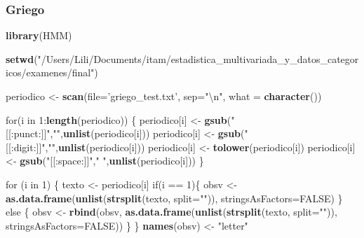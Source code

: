 \documentclass[]{article}
\newenvironment{Shaded}{\begin{snugshade}}{\end{snugshade}}
\newcommand{\KeywordTok}[1]{\textcolor[rgb]{0.13,0.29,0.53}{\textbf{{#1}}}}
\newcommand{\DataTypeTok}[1]{\textcolor[rgb]{0.13,0.29,0.53}{{#1}}}
\newcommand{\DecValTok}[1]{\textcolor[rgb]{0.00,0.00,0.81}{{#1}}}
\newcommand{\CharTok}[1]{\textcolor[rgb]{0.31,0.60,0.02}{{#1}}}
\newcommand{\StringTok}[1]{\textcolor[rgb]{0.31,0.60,0.02}{{#1}}}
\newcommand{\OtherTok}[1]{\textcolor[rgb]{0.56,0.35,0.01}{{#1}}}
\newcommand{\NormalTok}[1]{{#1}}
\begin{document}
\subsubsection{Griego}\label{griego}

\begin{Shaded}
\begin{Highlighting}[]
\KeywordTok{library}\NormalTok{(HMM)}

\KeywordTok{setwd}\NormalTok{(}\StringTok{"/Users/Lili/Documents/itam/estadistica_multivariada_y_datos_categoricos/examenes/final"}\NormalTok{)}


\NormalTok{periodico <-}\StringTok{ }\KeywordTok{scan}\NormalTok{(}\DataTypeTok{file=}\StringTok{'griego_test.txt'}\NormalTok{, }\DataTypeTok{sep=}\StringTok{"}\CharTok{\textbackslash{}n}\StringTok{"}\NormalTok{, }\DataTypeTok{what =} \KeywordTok{character}\NormalTok{())}



\NormalTok{for(i in }\DecValTok{1}\NormalTok{:}\KeywordTok{length}\NormalTok{(periodico)) \{}
  \NormalTok{periodico[i] <-}\StringTok{ }\KeywordTok{gsub}\NormalTok{(}\StringTok{"[[:punct:]]"}\NormalTok{,}\StringTok{""}\NormalTok{,}\KeywordTok{unlist}\NormalTok{(periodico[i]))}
  \NormalTok{periodico[i] <-}\StringTok{ }\KeywordTok{gsub}\NormalTok{(}\StringTok{"[[:digit:]]"}\NormalTok{,}\StringTok{""}\NormalTok{,}\KeywordTok{unlist}\NormalTok{(periodico[i]))}
  \NormalTok{periodico[i] <-}\StringTok{ }\KeywordTok{tolower}\NormalTok{(periodico[i])}
  \NormalTok{periodico[i] <-}\StringTok{ }\KeywordTok{gsub}\NormalTok{(}\StringTok{"[[:space:]]"}\NormalTok{,}\StringTok{" "}\NormalTok{,}\KeywordTok{unlist}\NormalTok{(periodico[i]))}
\NormalTok{\}}



\NormalTok{for (i in }\DecValTok{1}\NormalTok{) \{}
  \NormalTok{texto <-}\StringTok{ }\NormalTok{periodico[i]}
  \NormalTok{if(i ==}\StringTok{ }\DecValTok{1}\NormalTok{)\{}
    \NormalTok{obsv <-}\StringTok{ }\KeywordTok{as.data.frame}\NormalTok{(}\KeywordTok{unlist}\NormalTok{(}\KeywordTok{strsplit}\NormalTok{(texto, }\DataTypeTok{split=}\StringTok{""}\NormalTok{)), }\DataTypeTok{stringsAsFactors=}\OtherTok{FALSE}\NormalTok{)}
  \NormalTok{\} else \{}
    \NormalTok{obsv <-}\StringTok{ }\KeywordTok{rbind}\NormalTok{(obsv, }\KeywordTok{as.data.frame}\NormalTok{(}\KeywordTok{unlist}\NormalTok{(}\KeywordTok{strsplit}\NormalTok{(texto, }\DataTypeTok{split=}\StringTok{""}\NormalTok{)), }\DataTypeTok{stringsAsFactors=}\OtherTok{FALSE}\NormalTok{))}
  \NormalTok{\}}
\NormalTok{\}}
\KeywordTok{names}\NormalTok{(obsv) <-}\StringTok{ "letter"}


\end{Highlighting}
\end{Shaded}
\end{document}
